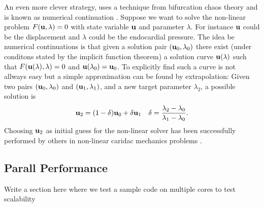 An even more clever strategy, uses a technique from bifurcation
chaos theory and is known as numerical continuation
\cite{allgower2003introduction}.  Suppose we want to
solve the non-linear problem $F(\mathbf{u}, \lambda)=0$ with state variable
$\mathbf{u}$ and parameter $\lambda$. For instance $\mathbf{u}$ could be the
displacement and $\lambda$ could be the endocardial pressure.
The idea be numerical continuations is that given a solution pair
$(\mathbf{u}_0, \lambda_0)$ there exist (under conditons stated by the
implicit function theorem) a solution curve $\mathbf{u}(\lambda)$ such that
$F(\mathbf{u}(\lambda), \lambda)=0$ and $\mathbf{u}(\lambda_0) = \mathbf{u}_0$.
To explicitly find such a curve is not allways easy but a simple
approximation can be found by extrapolation: Given two pairs
$(\mathbf{u}_0, \lambda_0)$ and $(\mathbf{u}_1, \lambda_1)$, and a new target
parameter $\lambda_2$, a possible solution is 
\begin{align}
  \mathbf{u}_2 =  (1-\delta)\mathbf{u}_0 + \delta \mathbf{u}_1 && \delta = \frac{\lambda_2 - \lambda_0}{\lambda_1 - \lambda_0}.
\end{align}
Choosing $\mathbf{u}_2$ as initial guess for the non-linear solver has been
successfully performed by others in non-linear caridac mechanics
problems \cite{pezzuto2013mechanics}. 


\subsection{Parall Performance}
Write a section here where we test a sample code on multiple cores to
test scalability




